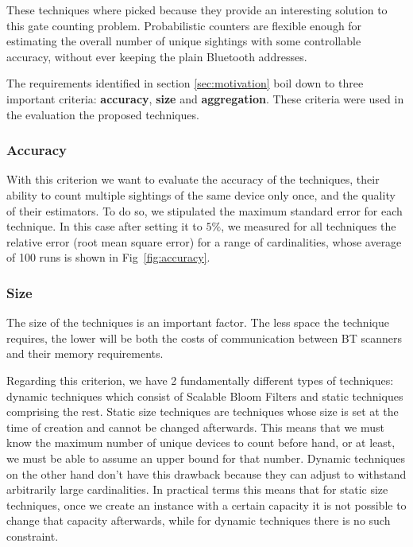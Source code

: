 These techniques where picked because they provide an interesting
solution to this gate counting problem. Probabilistic counters are
flexible enough for estimating the overall number of unique sightings
with some controllable accuracy, without ever keeping the plain
Bluetooth addresses.

The requirements identified in section \ref{sec:motivation} boil down
to three important criteria: \textbf{accuracy}, \textbf{size} and
\textbf{aggregation}. These criteria were used in the evaluation the
proposed techniques.



\subsubsection{Accuracy} 
\label{sec:accuracy} 

With this criterion we want to evaluate the accuracy of the
techniques, their ability to count multiple sightings of the same
device only once, and the quality of their estimators. To do so, we
stipulated the maximum standard error for each technique. In this case
after setting it to  $5\%$, we measured for all %
techniques the relative error (root mean square error) for a range of
cardinalities, whose average of 100 runs is shown in
Fig~\ref{fig:accuracy}.

\subsubsection{Size}
\label{sec:size}
The size of the techniques is an important factor. The less space the
technique requires, the lower will be both the costs of communication
between BT scanners and their memory requirements.

Regarding this criterion, we have 2 fundamentally different
types of techniques: dynamic techniques which consist of Scalable Bloom
Filters and static techniques comprising the rest. Static
size techniques are techniques whose size is set at the time of creation and
cannot be changed afterwards. This means that we must know the maximum
number of unique devices to count before hand, or at least, we must be able
to assume an upper bound for that number. Dynamic techniques on the other
hand don't have this drawback because they can adjust to withstand
arbitrarily large cardinalities. In practical terms this means that for
static size techniques, once we create an instance with a certain capacity
it is not possible to change that capacity afterwards, while for dynamic
techniques there is no such constraint.

